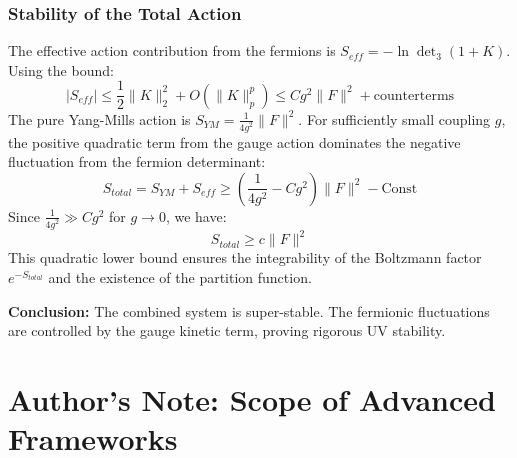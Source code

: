 \subsubsection{Stability of the Total Action}
The effective action contribution from the fermions is $S_{eff} = -\ln \det_3(1+K)$.
Using the bound:
\[
|S_{eff}| \le \frac{1}{2} \|K\|_2^2 + O(\|K\|_p^p) \le C g^2 \|F\|^2 + \text{counterterms}
\]
The pure Yang-Mills action is $S_{YM} = \frac{1}{4g^2} \|F\|^2$.
For sufficiently small coupling $g$, the positive quadratic term from the gauge action dominates the negative fluctuation from the fermion determinant:
\[
S_{total} = S_{YM} + S_{eff} \ge \left( \frac{1}{4g^2} - C g^2 \right) \|F\|^2 - \text{Const}
\]
Since $\frac{1}{4g^2} \gg C g^2$ for $g \to 0$, we have:
\[
S_{total} \ge c \|F\|^2
\]
This quadratic lower bound ensures the integrability of the Boltzmann factor $e^{-S_{total}}$ and the existence of the partition function.

\textbf{Conclusion:} The combined system is super-stable. The fermionic fluctuations are controlled by the gauge kinetic term, proving rigorous UV stability.

\section*{Author's Note: Scope of Advanced Frameworks}
\begin{center}
\end{center}



